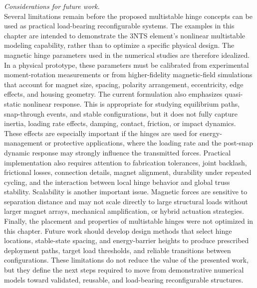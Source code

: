 \noindent{}\textit{Considerations for future work.}\\
Several limitations remain before the proposed multistable hinge concepts can be used as practical load-bearing reconfigurable systems. The examples in this chapter are intended to demonstrate the 3NTS element's nonlinear multistable modeling capability, rather than to optimize a specific physical design. The magnetic hinge parameters used in the numerical studies are therefore idealized. In a physical prototype, these parameters must be calibrated from experimental moment-rotation measurements or from higher-fidelity magnetic-field simulations that account for magnet size, spacing, polarity arrangement, eccentricity, edge effects, and housing geometry. The current formulation also emphasizes quasi-static nonlinear response. This is appropriate for studying equilibrium paths, snap-through events, and stable configurations, but it does not fully capture inertia, loading rate effects, damping, contact, friction, or impact dynamics. These effects are especially important if the hinges are used for energy-management or protective applications, where the loading rate and the post-snap dynamic response may strongly influence the transmitted forces. Practical implementation also requires attention to fabrication tolerances, joint backlash, frictional losses, connection details, magnet alignment, durability under repeated cycling, and the interaction between local hinge behavior and global truss stability. Scalability is another important issue. Magnetic forces are sensitive to separation distance and may not scale directly to large structural loads without larger magnet arrays, mechanical amplification, or hybrid actuation strategies. Finally, the placement and properties of multistable hinges were not optimized in this chapter. Future work should develop design methods that select hinge locations, stable-state spacing, and energy-barrier heights to produce prescribed deployment paths, target load thresholds, and reliable transitions between configurations. These limitations do not reduce the value of the presented work, but they define the next steps required to move from demonstrative numerical models toward validated, reusable, and load-bearing reconfigurable structures.

